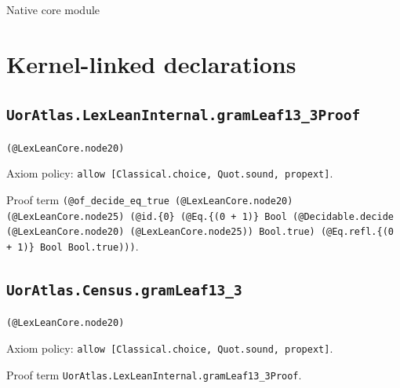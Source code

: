 \documentclass[11pt]{article}
\begin{document}
\begin{center}{\LARGE Native core module}\end{center}
\section*{Kernel-linked declarations}
\subsection*{\texttt{UorAtlas.LexLeanInternal.gramLeaf13\_3Proof}}
\noindent\texttt{(@LexLeanCore.node20)}\par
\noindent Axiom policy: \texttt{allow [Classical.choice, Quot.sound, propext]}.\par
\noindent Proof term \texttt{(@of\_decide\_eq\_true (@LexLeanCore.node20) (@LexLeanCore.node25) (@id.\{0\} (@Eq.\{(0 + 1)\} Bool (@Decidable.decide (@LexLeanCore.node20) (@LexLeanCore.node25)) Bool.true) (@Eq.refl.\{(0 + 1)\} Bool Bool.true)))}.\par
\subsection*{\texttt{UorAtlas.Census.gramLeaf13\_3}}
\noindent\texttt{(@LexLeanCore.node20)}\par
\noindent Axiom policy: \texttt{allow [Classical.choice, Quot.sound, propext]}.\par
\noindent Proof term \texttt{UorAtlas.LexLeanInternal.gramLeaf13\_3Proof}.\par
\end{document}
